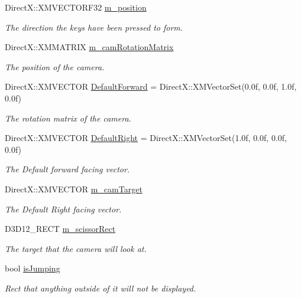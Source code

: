 \begin{DoxyCompactItemize}
Direct\+X\+::\+X\+M\+V\+E\+C\+T\+O\+R\+F32 \mbox{\hyperlink{class_camera_helper_a9f225b52b05df432872e8b541079935f}{m\+\_\+position}}
\begin{DoxyCompactList}\small\item\em The direction the keys have been pressed to form. \end{DoxyCompactList}\item 
Direct\+X\+::\+X\+M\+M\+A\+T\+R\+IX \mbox{\hyperlink{class_camera_helper_a995de11be349b7d74075f08fa5e2f437}{m\+\_\+cam\+Rotation\+Matrix}}
\begin{DoxyCompactList}\small\item\em The position of the camera. \end{DoxyCompactList}\item 
Direct\+X\+::\+X\+M\+V\+E\+C\+T\+OR \mbox{\hyperlink{class_camera_helper_a4f5d97db4f91d138f5ea4bf4416df132}{Default\+Forward}} = Direct\+X\+::\+X\+M\+Vector\+Set(0.\+0f, 0.\+0f, 1.\+0f, 0.\+0f)
\begin{DoxyCompactList}\small\item\em The rotation matrix of the camera. \end{DoxyCompactList}\item 
Direct\+X\+::\+X\+M\+V\+E\+C\+T\+OR \mbox{\hyperlink{class_camera_helper_af4ca47176953088f0f18adecf7bf4409}{Default\+Right}} = Direct\+X\+::\+X\+M\+Vector\+Set(1.\+0f, 0.\+0f, 0.\+0f, 0.\+0f)
\begin{DoxyCompactList}\small\item\em The Default forward facing vector. \end{DoxyCompactList}\item 
Direct\+X\+::\+X\+M\+V\+E\+C\+T\+OR \mbox{\hyperlink{class_camera_helper_abc1a814a0b54bfcb70f3e24bcd444f01}{m\+\_\+cam\+Target}}
\begin{DoxyCompactList}\small\item\em The Default Right facing vector. \end{DoxyCompactList}\item 
D3\+D12\+\_\+\+R\+E\+CT \mbox{\hyperlink{class_camera_helper_add052fea87500f1d3b2732ec46c3ae85}{m\+\_\+scissor\+Rect}}
\begin{DoxyCompactList}\small\item\em The target that the camera will look at. \end{DoxyCompactList}\item 
bool \mbox{\hyperlink{class_camera_helper_ac0dd816f2a5e8b4030b62e703ab92861}{is\+Jumping}}
\begin{DoxyCompactList}\small\item\em Rect that anything outside of it will not be displayed. \end{DoxyCompactList}\item 

\end{DoxyCompactItemize}

